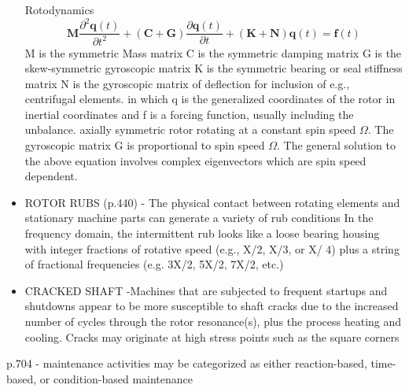 \begin{itemize}
Rotodynamics
$$ \mathbf{M} \frac{\partial^2 \mathbf{q}(t)}{\partial t^2} + (\mathbf{C} + \mathbf{G})\frac{\partial\mathbf{q}(t)}{\partial t} + (\mathbf{K} + \mathbf{N})\mathbf{q}(t) = \mathbf{f}(t) $$
    M is the symmetric Mass matrix
    C is the symmetric damping matrix
    G is the skew-symmetric gyroscopic matrix
    K is the symmetric bearing or seal stiffness matrix
    N is the gyroscopic matrix of deflection for inclusion of e.g., centrifugal elements.
in which q is the generalized coordinates of the rotor in inertial coordinates and f is a forcing function, usually including the unbalance. axially symmetric rotor rotating at a constant spin speed $\Omega$. The gyroscopic matrix G is proportional to spin speed $\Omega$. The general solution to the above equation involves complex eigenvectors which are spin speed dependent.
\item ROTOR RUBS (p.440) - The physical contact between rotating elements and stationary machine parts can generate a variety of rub conditions In the frequency domain, the intermittent rub looks like a loose bearing housing with integer fractions of rotative speed (e.g., X/2, X/3, or X/ 4) plus a string of fractional frequencies (e.g. 3X/2, 5X/2, 7X/2, etc.)
\item CRACKED SHAFT -Machines that are subjected to frequent startups and shutdowns appear to be more susceptible to shaft cracks due to the increased number of cycles through the rotor resonance(s), plus the process heating and cooling. Cracks may originate at high stress points such as the square corners
\end{itemize}
p.704 - maintenance activities may be categorized as either reaction-based, time-based, or condition-based maintenance

